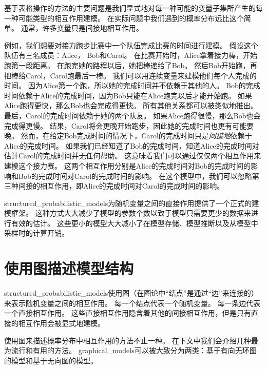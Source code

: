 基于表格操作的方法的主要问题是我们显式地对每一种可能的变量子集所产生的每一种可能类型的相互作用建模。
在实际问题中我们遇到的概率分布远比这个简单。
通常，许多变量只是间接地相互作用。


例如，我们想要对接力跑步比赛中一个队伍完成比赛的时间进行建模。
假设这个队伍有三名成员：Alice， Bob和Carol。
在比赛开始时，Alice拿着接力棒，开始跑第一段距离。
在跑完她的路程以后，她把棒递给了Bob。
然后Bob开始跑，再把棒给Carol，Carol跑最后一棒。
我们可以用连续变量来建模他们每个人完成的时间。
因为Alice第一个跑，所以她的完成时间并不依赖于其他的人。
Bob的完成时间依赖于Alice的完成时间，因为Bob只能在Alice跑完以后才能开始跑。
如果Alice跑得更快，那么Bob也会完成得更快。
所有其他关系都可以被类似地推出。
最后，Carol的完成时间依赖于她的两个队友。
如果Alice跑得很慢，那么Bob也会完成得更慢。
结果，Carol将会更晚开始跑步，因此她的完成时间也更有可能要晚。
然而，在给定Bob完成时间的情况下，Carol的完成时间只是\emph{间接地}依赖于Alice的完成时间。
如果我们已经知道了Bob的完成时间，知道Alice的完成时间对估计Carol的完成时间并无任何帮助。
这意味着我们可以通过仅仅两个相互作用来建模这个接力赛。
这两个相互作用分别是Alice的完成时间对Bob的完成时间的影响和Bob的完成时间对Carol的完成时间的影响。
在这个模型中，我们可以忽略第三种间接的相互作用，即Alice的完成时间对Carol的完成时间的影响。


\gls{structured_probabilistic_models}为随机变量之间的直接作用提供了一个正式的建模框架。
这种方式大大减少了模型的参数个数以致于模型只需要更少的数据来进行有效的估计。
这些更小的模型大大减小了在模型存储、模型推断以及从模型中采样时的计算开销。


\section{使用图描述模型结构}
\label{sec:using_graphs_to_describe_model_structure}


\gls{structured_probabilistic_models}使用图（在图论中``结点''是通过``边''来连接的）来表示随机变量之间的相互作用。
每一个结点代表一个随机变量。
每一条边代表一个直接相互作用。
这些直接相互作用隐含着其他的间接相互作用，但是只有直接的相互作用会被显式地建模。


使用图来描述概率分布中相互作用的方法不止一种。
在下文中我们会介绍几种最为流行和有用的方法。
\gls{graphical_models}可以被大致分为两类：基于有向无环图的模型和基于无向图的模型。


\subsection{}
\label{sec:directed_models}


